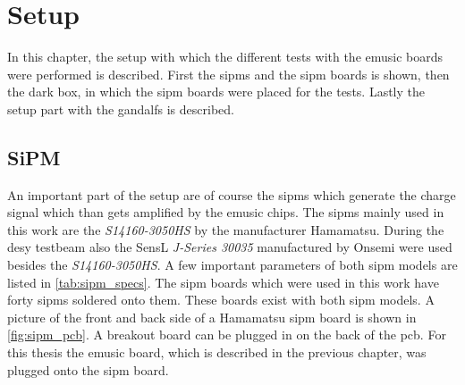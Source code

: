 \chapter{Setup}

In this chapter, the setup with which the different tests with the \ac{emusic} boards were performed is described.
First the \acp{sipm} and the \ac{sipm} boards is shown, then the dark box, in which the \ac{sipm} boards were placed for the tests.
Lastly the setup part with the \acp{gandalf} is described.

\section{SiPM}
An important part of the setup are of course the \acp{sipm} which generate the charge signal which than gets amplified by the \ac{emusic} chips.
The \acp{sipm} mainly used in this work are the \textit{S14160-3050HS} by the manufacturer Hamamatsu.
During the \ac{desy} testbeam also the SensL \textit{J-Series 30035} manufactured by Onsemi were used besides the \textit{S14160-3050HS}.
A few important parameters of both \ac{sipm} models are listed in \autoref{tab:sipm_specs}.
The \ac{sipm} boards which were used in this work have forty \acp{sipm} soldered onto them.
These boards exist with both \ac{sipm} models.
A picture of the front and back side of a Hamamatsu \ac{sipm} board is shown in \autoref{fig:sipm_pcb}.
A breakout board can be plugged in on the back of the \ac{pcb}.
For this thesis the \ac{emusic} board, which is described in the previous chapter, was plugged onto the \ac{sipm} board.
